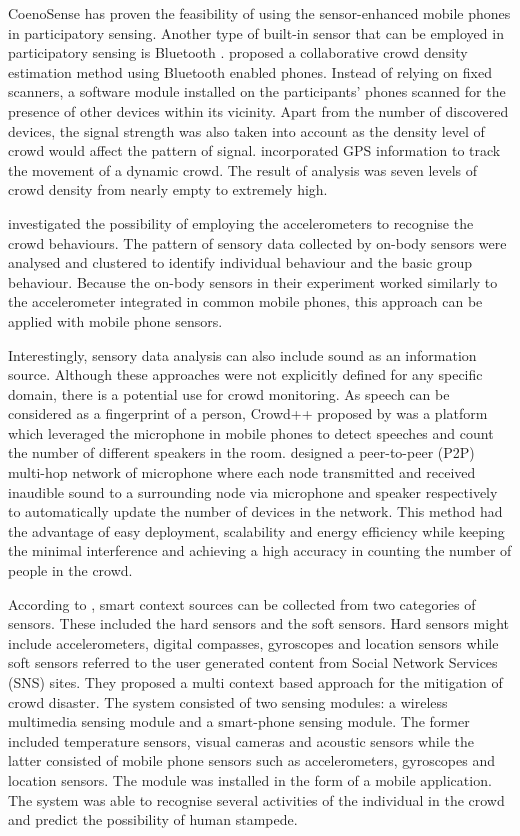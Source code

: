 CoenoSense has proven the feasibility of using the sensor-enhanced mobile phones in participatory sensing. Another type of built-in sensor that can be employed in participatory sensing is Bluetooth \parencite{Stopczynski2013,Weppner2011,Weppner2013}. \textcite{Weppner2011} proposed a collaborative crowd density estimation method using Bluetooth enabled phones. Instead of relying on fixed scanners, a software module installed on the participants’ phones scanned for the presence of other devices within its vicinity. Apart from the number of discovered devices, the signal strength was also taken into account as the density level of crowd would affect the pattern of signal. \textcite{Weppner2013} incorporated GPS information to track the movement of a dynamic crowd. The result of analysis was seven levels of crowd density from nearly empty to extremely high.

\textcite{Roggen2011} investigated the possibility of employing the accelerometers to recognise the crowd behaviours. The pattern of sensory data collected by on-body sensors were analysed and clustered to identify individual behaviour and the basic group behaviour. Because the on-body sensors in their experiment worked similarly to the accelerometer integrated in common mobile phones, this approach can be applied with mobile phone sensors.

Interestingly, sensory data analysis can also include sound as an information source. Although these approaches were not explicitly defined for any specific domain, there is a potential use for crowd monitoring. As speech can be considered as a fingerprint of a person, Crowd++ proposed by \textcite{Xu2013} was a platform which leveraged the microphone in mobile phones to detect speeches and count the number of different speakers in the room. \textcite{Kannan2012} designed a peer-to-peer (P2P) multi-hop network of microphone where each node transmitted and received inaudible sound to a surrounding node via microphone and speaker respectively to automatically update the number of devices in the network. This method had the advantage of easy deployment, scalability and energy efficiency while keeping the minimal interference and achieving a high accuracy in counting the number of people in the crowd.

According to \textcite{Ramesh2014}, smart context sources can be collected from two categories of sensors. These included the hard sensors and the soft sensors. Hard sensors might include accelerometers, digital compasses, gyroscopes and location sensors while soft sensors referred to the user generated content from Social Network Services (SNS) sites. They proposed a multi context based approach for the mitigation of crowd disaster. The system consisted of two sensing modules: a wireless multimedia sensing module and a smart-phone sensing module. The former included temperature sensors, visual cameras and acoustic sensors while the latter consisted of mobile phone sensors such as accelerometers, gyroscopes and location sensors. The module was installed in the form of a mobile application. The system was able to recognise several activities of the individual in the crowd and predict the possibility of human stampede.


